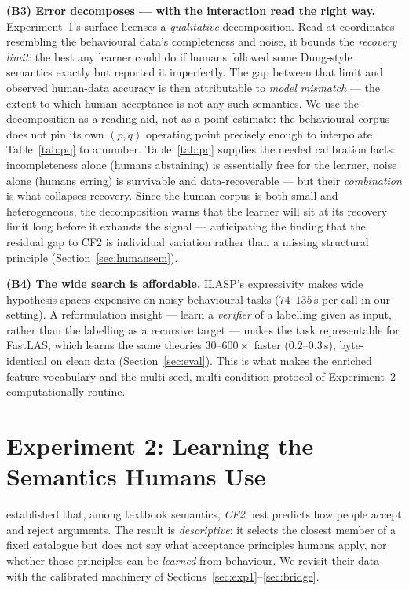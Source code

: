 \documentclass[review,12pt]{elsarticle}
\theoremstyle{definition}
\theoremstyle{remark}
\begin{document}
\textbf{(B3) Error decomposes --- with the interaction read the right way.}
Experiment~1's surface licenses a \emph{qualitative} decomposition. Read at
coordinates resembling the behavioural data's completeness and noise, it
bounds the \emph{recovery limit}: the best any learner could do if humans
followed some Dung-style semantics exactly but reported it imperfectly. The
gap between that limit and observed human-data accuracy is then attributable
to \emph{model mismatch} --- the extent to which human acceptance is not any
such semantics. We use the decomposition as a reading aid, not as a point
estimate: the behavioural corpus does not pin its own $(p,q)$ operating point
precisely enough to interpolate Table~\ref{tab:pq} to a number. Table~\ref{tab:pq} supplies the needed calibration facts:
incompleteness alone (humans abstaining) is essentially free for the learner,
noise alone (humans erring) is survivable and data-recoverable --- but their
\emph{combination} is what collapses recovery. Since the human corpus is both
small and heterogeneous, the decomposition warns that the learner will sit at
its recovery limit long before it exhausts the signal --- anticipating the
finding that the residual gap to CF2 is individual variation rather than a
missing structural principle (Section~\ref{sec:humansem}).

\textbf{(B4) The wide search is affordable.} ILASP's expressivity makes wide
hypothesis spaces expensive on noisy behavioural tasks ($74$--$135$\,s per
call in our setting). A reformulation insight --- learn a
\emph{verifier} of a labelling given as input, rather than the labelling as a
recursive target --- makes the task representable for FastLAS, which learns the
same theories $30$--$600\times$ faster ($0.2$--$0.3$\,s), byte-identical on
clean data (Section~\ref{sec:eval}). This is what makes the enriched feature
vocabulary and the multi-seed, multi-condition protocol of Experiment~2
computationally routine.

\section{Experiment 2: Learning the Semantics Humans Use}
\label{sec:exp2}

\citet{guillaume2022} established that, among textbook semantics, \emph{CF2}
best predicts how people accept and reject arguments. The result is
\emph{descriptive}: it selects the closest member of a fixed catalogue but does
not say what acceptance principles humans apply, nor whether those principles
can be \emph{learned} from behaviour. We revisit their data with the calibrated
machinery of Sections~\ref{sec:exp1}--\ref{sec:bridge}.
\end{document}
